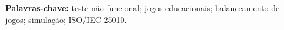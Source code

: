 \documentclass[12pt]{article}
\begin{document}
\noindent\textbf{Palavras-chave:} teste não funcional; jogos educacionais; balanceamento de jogos;
simulação; ISO/IEC 25010.











\end{document}
